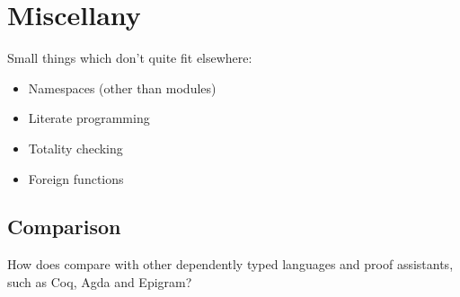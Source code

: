 \section{Miscellany}

Small things which don't quite fit elsewhere:

\begin{itemize}
\item Namespaces (other than modules)
\item Literate programming
\item Totality checking
\item Foreign functions
\end{itemize}

\subsection{Comparison}

How does \Idris{} compare with other dependently typed languages and proof
assistants, such as Coq, Agda and Epigram?
